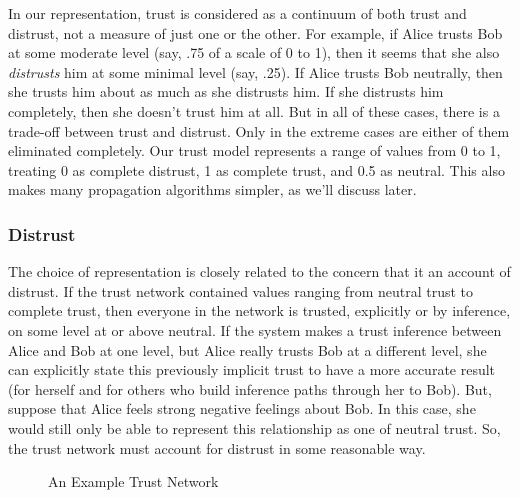 \documentclass[letterpaper]{www2006-submission}
\begin{document}
In our representation, trust is considered as a continuum of both trust and distrust, not a measure of just one or the other.  For example, if Alice trusts Bob at some moderate level (say, .75 of a scale of 0 to 1), then it seems that she also \textit{distrusts} him at some minimal level (say, .25).  If Alice trusts Bob neutrally, then she trusts him about as much as she distrusts him.  If she distrusts him completely, then she doesn't trust him at all.  But in all of these cases, there is a trade-off between trust and distrust.  Only in the extreme cases are either of them eliminated completely.  Our trust model represents a range of values from 0 to 1, treating 0 as complete distrust, 1 as complete trust, and 0.5 as neutral.  This also makes many propagation algorithms simpler, as we'll discuss later.

\subsubsection{Distrust}
The choice of representation is closely related to the concern that it an account of distrust.  If the trust network contained values ranging from neutral trust to complete trust, then everyone in the network is trusted, explicitly or by inference, on some level at or above neutral.  If the system makes a trust inference between Alice and Bob at one level, but Alice really trusts Bob at a different level, she can explicitly state this previously implicit trust to have a more accurate result (for herself and for others who build inference paths through her to Bob).  But, suppose that Alice feels strong negative feelings about Bob.  In this case, she would still only be able to represent this relationship as one of neutral trust.  So, the trust network must account for distrust in some reasonable way.

\begin{figure}[thp]
\centering
{}
\caption{An Example Trust Network}
\label{fig:trust}
\end{figure}
\end{document}
